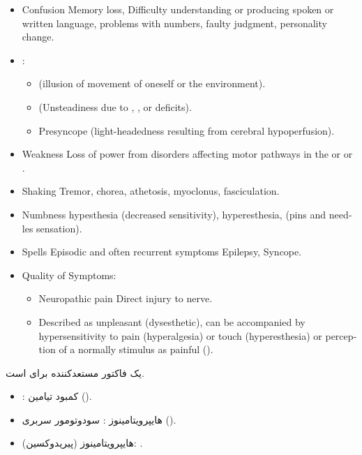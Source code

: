 \documentclass[a4paper,12pt]{extbook}
\begin{document}
\begin{latin}
\begin{itemize}
\item Confusion \NEarrow{} Memory loss, Difficulty understanding or producing spoken or written language, problems with numbers, faulty judgment, personality change.
\item {}:
  \begin{itemize}
  \item {} (illusion of movement of oneself or the environment).
  \item {} (Unsteadiness due to , ,  or  deficits).
  \item Presyncope (light-headedness resulting from cerebral hypoperfusion).
  \end{itemize}
\item Weakness \NEarrow{} Loss of power from disorders affecting motor pathways in the  or  or .
\item Shaking \NEarrow{} Tremor, chorea, athetosis, myoclonus, fasciculation.
\item Numbness \NEarrow{} hypesthesia (decreased sensitivity), hyperesthesia,  (pins and needles sensation).
\item Spells \NEarrow{} Episodic and often recurrent symptoms \NEarrow{} Epilepsy, Syncope.
\item Quality of Symptoms:
  \begin{itemize}
  \item Neuropathic pain \NEarrow{} Direct injury to nerve.
  \item Described as unpleasant (dysesthetic), can be accompanied by hypersensitivity to pain (hyperalgesia) or touch (hyperesthesia) or perception of a normally stimulus as painful ().
  \end{itemize}
\end{itemize}
\end{latin}
 یک فاکتور مستعدکننده برای  است.

\begin{itemize}
\item {}: کمبود تیامین ().
\item هایپرویتامینوز : سودوتومور سربری ().
\item هایپرویتامینوز  (پیریدوکسین): .
\end{itemize}
\end{document}
